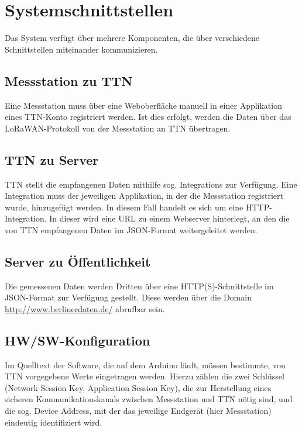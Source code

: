 \section{Systemschnittstellen}

Das System verf\"ugt \"uber mehrere Komponenten, die \"uber verschiedene
Schnittstellen miteinander kommunizieren.

\subsection{Messstation zu TTN}
Eine Messstation muss \"uber eine Weboberfl\"ache manuell in einer Applikation
eines TTN-Konto registriert werden. Ist dies erfolgt, werden die Daten \"uber
das LoRaWAN-Protokoll von der Messstation an TTN \"ubertragen.

\subsection{TTN zu Server}
TTN stellt die empfangenen Daten mithilfe sog. \glqq Integrations\grqq{} zur Verf\"ugung.
Eine \glqq Integration\grqq{} muss der jeweiligen Applikation, in der die Messstation registriert
wurde, hinzugef\"ugt werden.
In diesem Fall handelt es sich um eine \glqq HTTP-Integration\grqq. In dieser wird eine URL zu
einem Webserver hinterlegt, an den die von TTN empfangenen Daten im JSON-Format
weitergeleitet werden.

\subsection{Server zu \"Offentlichkeit}
Die gemessenen Daten werden Dritten \"uber eine HTTP(S)-Schnittstelle im JSON-Format zur Verf\"ugung gestellt.
Diese werden \"uber die Domain \url{http://www.berlinerdaten.de/} abrufbar sein.

\subsection{HW/SW-Konfiguration}

Im Quelltext der Software, die auf dem Arduino l\"auft, m\"ussen bestimmte, von TTN vorgegebene
Werte eingetragen werden. Hierzu z\"ahlen die zwei Schl\"ussel (\glqq Network Session Key\grqq,
\glqq Application Session Key\grqq), die zur Herstellung eines sicheren Kommunikationskanals
zwischen Messstation und TTN n\"otig sind, und die sog. \glqq Device Address\grqq, mit der
das jeweilige Endger\"at (hier Messstation) eindeutig identifiziert wird.
